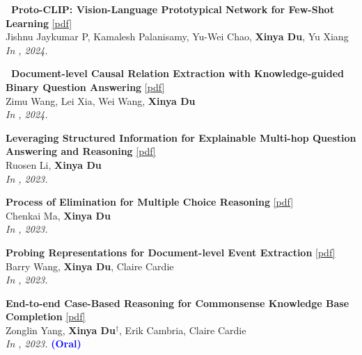 \begin{enumerate}[{[}1{]},leftmargin=*]
\item 
{\bf\ Proto-CLIP: Vision-Language Prototypical Network for Few-Shot Learning} 
\href{https://arxiv.org/pdf/2307.03073}{{[pdf]}} \\
Jishnu Jaykumar P, Kamalesh Palanisamy, Yu-Wei Chao, \textbf{Xinya Du}, Yu Xiang \\
{\it In \IROS, 2024.} \\


\item 
{\bf\ Document-level Causal Relation Extraction with Knowledge-guided Binary Question Answering} 
\href{https://arxiv.org/pdf/2410.04752}{{[pdf]}} \\
Zimu Wang, Lei Xia, Wei Wang, \textbf{Xinya Du}  \\
{\it In \EMNLPfinding, 2024.} \\



\item 
{\bf Leveraging Structured Information for Explainable Multi-hop Question Answering and Reasoning} 
\href{https://aclanthology.org/2023.findings-emnlp.452.pdf}{{[pdf]}} \\
Ruosen Li, \textbf{Xinya Du} \\
{\it In \EMNLPfinding, 2023.} \\


\item 
{\bf Process of Elimination for Multiple Choice Reasoning} 
\href{https://aclanthology.org/2023.emnlp-main.273.pdf}{{[pdf]}} \\
Chenkai Ma, \textbf{Xinya Du} \\
{\it In \EMNLP, 2023.} \\

\item 
{\bf Probing Representations for Document-level Event Extraction} 
\href{https://aclanthology.org/2023.findings-emnlp.844.pdf}{{[pdf]}} \\
Barry Wang, \textbf{Xinya Du}, Claire Cardie \\
{\it In \EMNLPfinding, 2023.} \\

\item 
{\bf End-to-end Case-Based Reasoning for Commonsense Knowledge Base Completion} 
\href{https://aclanthology.org/2023.eacl-main.255.pdf}{{[pdf]}} \\
Zonglin Yang, \textbf{Xinya Du}$^{\dagger}$, Erik Cambria, Claire Cardie \\
{\it In \EACL, 2023.} {\textcolor{blue}{\textbf{(Oral)}}} \\ 


\end{enumerate}
